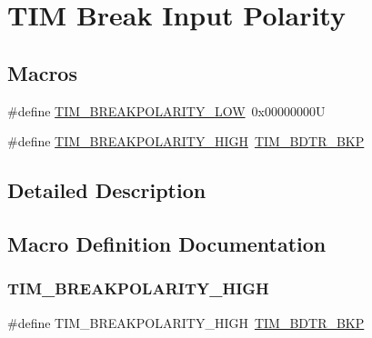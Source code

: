 \hypertarget{group___t_i_m___break___polarity}{}\section{T\+IM Break Input Polarity}
\label{group___t_i_m___break___polarity}
\subsection*{Macros}
\begin{DoxyCompactItemize}
\item 
\#define \hyperlink{group___t_i_m___break___polarity_ga3e07cb0376c1bf561341dc8befb66208}{T\+I\+M\+\_\+\+B\+R\+E\+A\+K\+P\+O\+L\+A\+R\+I\+T\+Y\+\_\+\+L\+OW}~0x00000000U
\item 
\#define \hyperlink{group___t_i_m___break___polarity_ga97c30f1134accd61e3e42ce37e472700}{T\+I\+M\+\_\+\+B\+R\+E\+A\+K\+P\+O\+L\+A\+R\+I\+T\+Y\+\_\+\+H\+I\+GH}~\hyperlink{group___peripheral___registers___bits___definition_ga3247abbbf0d00260be051d176d88020e}{T\+I\+M\+\_\+\+B\+D\+T\+R\+\_\+\+B\+KP}
\end{DoxyCompactItemize}


\subsection{Detailed Description}


\subsection{Macro Definition Documentation}
\mbox{\label{group___t_i_m___break___polarity_ga97c30f1134accd61e3e42ce37e472700}} 
\subsubsection{\texorpdfstring{T\+I\+M\+\_\+\+B\+R\+E\+A\+K\+P\+O\+L\+A\+R\+I\+T\+Y\+\_\+\+H\+I\+GH}{TIM\_BREAKPOLARITY\_HIGH}}
{\footnotesize\ttfamily \#define T\+I\+M\+\_\+\+B\+R\+E\+A\+K\+P\+O\+L\+A\+R\+I\+T\+Y\+\_\+\+H\+I\+GH~\hyperlink{group___peripheral___registers___bits___definition_ga3247abbbf0d00260be051d176d88020e}{T\+I\+M\+\_\+\+B\+D\+T\+R\+\_\+\+B\+KP}}

